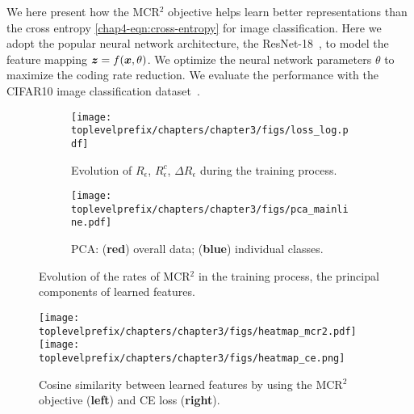\documentclass[../../book-main.tex]{subfiles}
\begin{document}
\begin{example}
	We here present how the MCR$^2$ objective helps learn better representations than the cross entropy \eqref{chap4-eqn:cross-entropy} for image classification. Here we adopt the popular neural network architecture, the ResNet-18~\cite{he2016deep}, to model the feature mapping $\bm{z} = f(\bm{x},\theta)$. We optimize the neural network parameters $\theta$ to maximize the coding rate reduction. We evaluate the performance with the CIFAR10 image classification dataset~\cite{krizhevsky2009learning}.

	\begin{figure}[t]
		\begin{subfigure}[t]{0.42\textwidth}
			\centering
			\texttt{[image: \\toplevelprefix/chapters/chapter3/figs/loss\_log.pdf]}
			\caption{Evolution of $R_\epsilon$, $R^c_\epsilon$, $\Delta R_\epsilon$ during the training process.}
			\label{fig:train-test-loss-pca-1}
		\end{subfigure}
		\hfill
		\begin{subfigure}[t]{0.42\textwidth}
			\centering
			\texttt{[image: \\toplevelprefix/chapters/chapter3/figs/pca\_mainline.pdf]}
			\caption{PCA: {\small (\textbf{red}) overall data; (\textbf{blue}) individual classes}.}
			\label{fig:train-test-loss-pca-3}
		\end{subfigure}
		\caption{\small Evolution of the rates of MCR$^2$ in the training process, the principal components of learned features.}
		\label{fig:train-test-loss-pca}
	\end{figure}


	\begin{figure*}[b]
		\begin{center}

			\texttt{[image: \\toplevelprefix/chapters/chapter3/figs/heatmap\_mcr2.pdf]}
			\hspace{0.25cm}
			\texttt{[image: \\toplevelprefix/chapters/chapter3/figs/heatmap\_ce.png]}
			\caption{\small Cosine similarity between learned features by using the MCR$^2$ objective  (\textbf{left}) and CE loss (\textbf{right}).}
			\label{fig:heatmap-plot}
		\end{center}
		\vskip -0.1in
	\end{figure*}


\end{example}
\end{document}
